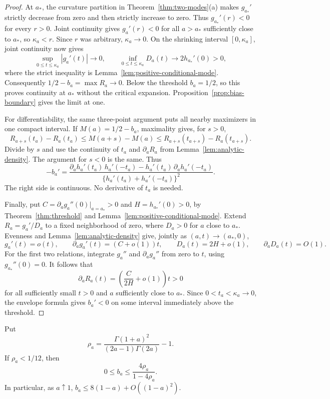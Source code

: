 \begin{proof}
At $a_*$, the curvature partition in Theorem~\ref{thm:two-modes}(a)
makes $g_{a_*}'$ strictly decrease from zero and then strictly increase
to zero. Thus $g_{a_*}'(r)<0$ for every $r>0$.
Joint continuity gives $g_a'(r)<0$ for all $a>a_*$ sufficiently close
to $a_*$, so $\kappa_a<r$. Since $r$ was arbitrary, $\kappa_a\to0$.
On the shrinking interval $[0,\kappa_a]$, joint continuity now gives
\[
 \sup_{0\le t\le\kappa_a}|g_a'(t)|\longrightarrow0,\qquad
 \inf_{0\le t\le\kappa_a}D_a(t)\longrightarrow2h_{a_*}'(0)>0,
\]
where the strict inequality is Lemma~\ref{lem:positive-conditional-mode}.
Consequently $1/2-b_a=\max R_a\to0$. Below the threshold $b_a=1/2$,
so this proves continuity at $a_*$ without the critical expansion.
Proposition~\ref{prop:bias-boundary} gives the limit at one.

For differentiability, the same three-point argument puts all nearby
maximizers in one compact interval. If $M(a)=1/2-b_a$, maximality gives,
for $s>0$,
\[
 R_{a+s}(t_a)-R_a(t_a)
 \le M(a+s)-M(a)
 \le R_{a+s}(t_{a+s})-R_a(t_{a+s}).
\]
Divide by $s$ and use the continuity of $t_a$ and
$\partial_aR_a$ from Lemma~\ref{lem:analytic-density}. The argument
for $s<0$ is the same. Thus
\begin{equation}\label{eq:bias-envelope-derivative}
 -b_a'=
 \frac{\partial_a h_a'(t_a)\,h_a'(-t_a)
       -h_a'(t_a)\,\partial_a h_a'(-t_a)}
      {\{h_a'(t_a)+h_a'(-t_a)\}^2}.
\end{equation}
The right side is continuous. No derivative of $t_a$ is needed.

Finally, put $C=\partial_a g_a''(0)|_{a=a_*}>0$ and
$H=h_{a_*}'(0)>0$, by Theorem~\ref{thm:threshold} and
Lemma~\ref{lem:positive-conditional-mode}.
Extend $R_a=g_a'/D_a$ to a fixed neighborhood of zero, where
$D_a>0$ for $a$ close to $a_*$. Evenness and
Lemma~\ref{lem:analytic-density} give, jointly as $(a,t)\to(a_*,0)$,
\[
 g_a'(t)=o(t),\qquad \partial_a g_a'(t)=(C+o(1))t,\qquad
 D_a(t)=2H+o(1),\qquad \partial_aD_a(t)=O(1).
\]
For the first two relations, integrate $g_a''$ and $\partial_a g_a''$
from zero to $t$, using $g_{a_*}''(0)=0$.
It follows that
\[
 \partial_aR_a(t)=\left(\frac{C}{2H}+o(1)\right)t>0
\]
for all sufficiently small $t>0$ and $a$ sufficiently close to $a_*$.
Since $0<t_a<\kappa_a\to0$, the envelope formula gives $b_a'<0$
on some interval immediately above the threshold.
\end{proof}

\begin{corollary}\label{cor:bias-boundary-rate}
Put
\[
 \rho_a=\frac{\Gamma(1+a)^2}{(2a-1)\Gamma(2a)}-1.
\]
If $\rho_a<1/12$, then
\[
 0\le b_a\le\frac{4\rho_a}{1-4\rho_a}.
\]
In particular, as $a\uparrow1$,
$b_a\le8(1-a)+O((1-a)^2)$.
\end{corollary}

